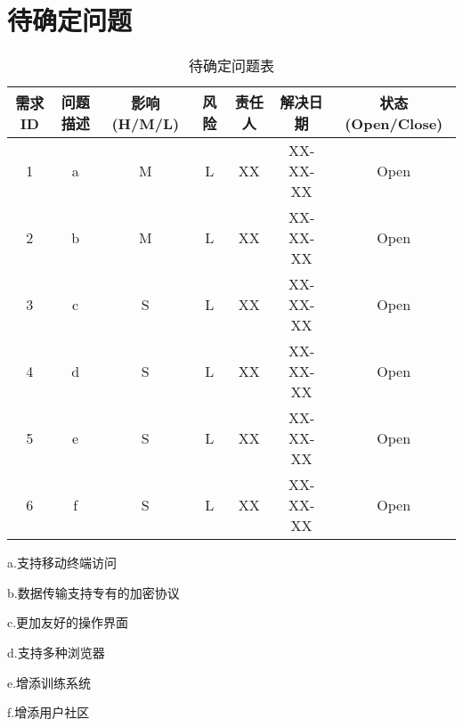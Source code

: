 \chapter{待确定问题}
\begin{table}[htbp]
\centering
\caption{待确定问题表} \label{tab:tbd_problems}
\begin{tabular}{|c|c|c|c|c|c|c|}
    \hline
    需求ID & 问题描述 & 影响(H/M/L) & 风险 & 责任人 & 解决日期 & 状态(Open/Close) \\
    \hline
    1 & a & M & L & XX & XX-XX-XX & Open\\
    \hline
    2 & b & M & L & XX & XX-XX-XX & Open\\
    \hline
    3 & c & S & L & XX & XX-XX-XX & Open\\
    \hline
    4 & d & S & L & XX & XX-XX-XX & Open\\
    \hline
    5 & e & S & L & XX & XX-XX-XX & Open\\
    \hline
    6 & f & S & L & XX & XX-XX-XX & Open\\
    \hline
    
    \hline
\end{tabular}
\end{table}
a.支持移动终端访问

b.数据传输支持专有的加密协议

c.更加友好的操作界面

d.支持多种浏览器

e.增添训练系统

f.增添用户社区